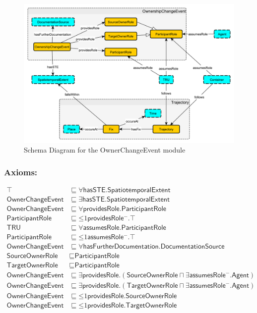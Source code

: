 \begin{figure}[tb]
\begin{center}
\includegraphics[width=.9\textwidth]{diagrams/owner-change_event}
\end{center}
\caption{Schema Diagram for the OwnerChangeEvent module}
\label{fig:OwnerChangeEvent}
\end{figure}

\subsubsection*{Axioms:}
\begin{align}
    \top &\sqsubseteq \forall\textsf{hasSTE.SpatiotemporalExtent}\\
    \textsf{OwnerChangeEvent} &\sqsubseteq \exists\textsf{hasSTE.SpatiotemporalExtent}\\
    \textsf{OwnerChangeEvent} &\sqsubseteq \forall\textsf{providesRole.ParticipantRole}\\
    \textsf{ParticipantRole} &\sqsubseteq \mathord{\leq}1 \textsf{providesRole}\mathord{^-}.\top\\
    \textsf{TRU} &\sqsubseteq \forall\textsf{assumesRole.ParticipantRole}\\
    \textsf{ParticipantRole} &\sqsubseteq \mathord{\leq} 1 \textsf{assumesRole}\mathord{^-}.\top\\
    \textsf{OwnerChangeEvent} &\sqsubseteq \forall\textsf{hasFurtherDocumentation.DocumentationSource} \\
    \textsf{SourceOwnerRole} &\sqsubseteq \textsf{ParticipantRole}\\
    \textsf{TargetOwnerRole} &\sqsubseteq \textsf{ParticipantRole}\\
    \textsf{OwnerChangeEvent} &\sqsubseteq \exists\textsf{providesRole}.(\textsf{SourceOwnerRole} \sqcap \exists \textsf{assumesRole}^-.\textsf{Agent})\\
    \textsf{OwnerChangeEvent} &\sqsubseteq \exists\textsf{providesRole}.(\textsf{TargetOwnerRole} \sqcap \exists \textsf{assumesRole}^-.\textsf{Agent})\\
    \textsf{OwnerChangeEvent} &\sqsubseteq \mathord{\leq}1\textsf{providesRole.SourceOwnerRole}\\
    \textsf{OwnerChangeEvent} &\sqsubseteq \mathord{\leq}1\textsf{providesRole.TargetOwnerRole} 
\end{align}

